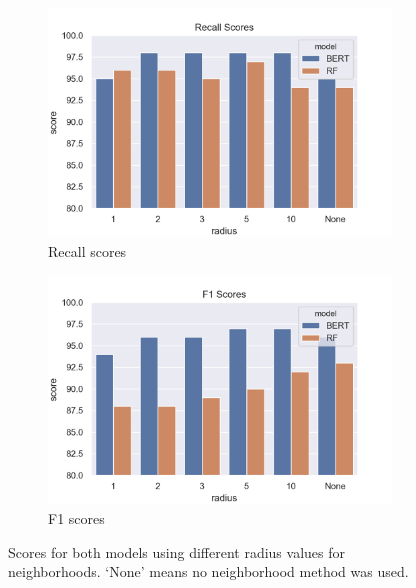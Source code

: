\documentclass[12pt, a4paper]{article}
\begin{document}
\begin{figure}[!h]
\begin{subfigure}[b]{0.48\textwidth}
        \includegraphics[width=\textwidth]{Recall_barplot.png}
        \caption[]%
        {{\small Recall scores}}    
        \label{fig:rec}
    \end{subfigure}
    \quad
    \begin{subfigure}[b]{0.48\textwidth}   
        \centering 
        \includegraphics[width=\textwidth]{F1_barplot.png}
        \caption[]%
        {{\small F1 scores}}    
        \label{fig:f1}
    \end{subfigure}
    \caption[Scores for both models using different radius values for neighborhoods. `None' means no neighborhood method was used.]
    {\small Scores for both models using different radius values for neighborhoods. `None' means no neighborhood method was used.} 
    \label{fig:scores}
\end{figure}
\newpage
\end{document}
